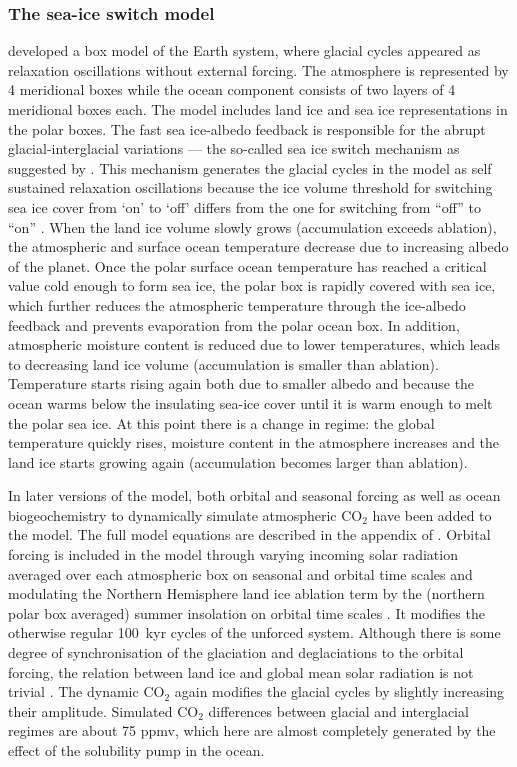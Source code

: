 \documentclass[12pt]{article}
\begin{document}

\subsubsection{The sea-ice switch model}
\cite{Gildor2001a} developed a box model of the Earth system, where glacial cycles appeared as relaxation oscillations without external forcing. The atmosphere is represented by 4 meridional boxes while the ocean component consists of two layers of 4 meridional boxes each. The model includes land ice and sea ice representations in the polar boxes. 
The fast sea ice-albedo feedback is responsible for the abrupt glacial-interglacial variations --- the so-called sea ice switch mechanism as suggested by \citet{Gildor2001a}.  This mechanism generates the glacial cycles in the model as self sustained relaxation oscillations because the ice volume threshold for switching sea ice cover from `on' to `off' differs from the one for switching from ``off'' to ``on'' \citep{Crucifix2012a}. When the land ice volume slowly grows (accumulation exceeds ablation), the atmospheric and surface ocean temperature decrease due to increasing albedo of the planet.
Once the polar surface ocean temperature has reached a critical value cold enough to form sea ice, the polar box is rapidly covered with sea ice, which further reduces the atmospheric temperature through the ice-albedo feedback and prevents evaporation from the polar ocean box. In addition, atmospheric moisture content is reduced due to lower temperatures, which leads to decreasing land ice volume (accumulation is smaller than ablation). Temperature starts rising again both due to smaller albedo and because the ocean warms below the insulating sea-ice cover until it is warm enough to melt the polar sea ice. At this point there is a change in regime: the global temperature quickly rises, moisture content in the atmosphere increases and the land ice starts growing again (accumulation becomes larger than ablation). 

In later versions of the model, both orbital and seasonal forcing  \cite{Gildor2000} as well as ocean biogeochemistry to dynamically simulate atmospheric CO$_2$ \cite{Gildor2002} have been added to the model. The full model equations are described in the appendix of \cite{vonderHeydt:2017dw}. 
Orbital forcing is included in the model through varying incoming solar radiation averaged over each atmospheric box on seasonal and orbital time scales and modulating the Northern Hemisphere land ice ablation term by the (northern polar box averaged) summer insolation on orbital time scales \citep{Gildor2000}. It modifies the otherwise regular 100~kyr cycles of the unforced system. Although there is some degree of synchronisation of the glaciation and deglaciations to the orbital forcing, the relation between land ice and global mean solar radiation is not trivial \cite{vonderHeydt:2017dw}. 
The dynamic CO$_2$ again modifies the glacial cycles by slightly increasing their amplitude. Simulated CO$_2$ differences between glacial and interglacial regimes are about 75 ppmv, which here are almost  completely generated by the effect of the solubility pump in the ocean.
\end{document}
